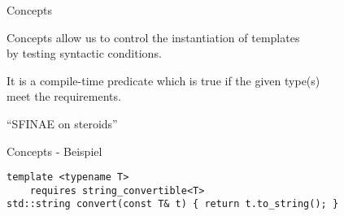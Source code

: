 \begin{frame}{Concepts}
    \begin{center}
        Concepts allow us to control the instantiation of templates\\by testing syntactic conditions.

        \vspace{2.5em}

        It is a compile-time predicate which is true if the given type(s)\\meet the requirements.

        \vspace{2.5em}

        \enquote{SFINAE on steroids}
    \end{center}
\end{frame}

\begin{frame}[fragile]{Concepts - Beispiel}
    \begin{verbatim}
template <typename T>
    requires string_convertible<T>
std::string convert(const T& t) { return t.to_string(); }
    \end{verbatim}
\end{frame}